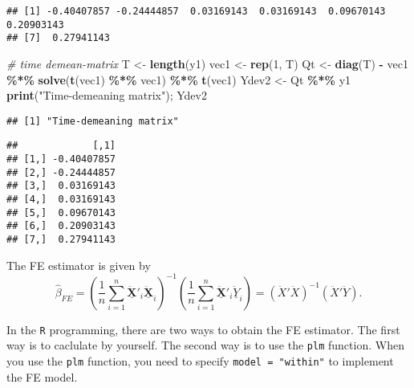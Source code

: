 \documentclass[
  12pt,
]{article}
\newenvironment{Shaded}{\begin{snugshade}}{\end{snugshade}}
\newcommand{\CommentTok}[1]{\textcolor[rgb]{0.56,0.35,0.01}{\textit{#1}}}
\newcommand{\DecValTok}[1]{\textcolor[rgb]{0.00,0.00,0.81}{#1}}
\newcommand{\KeywordTok}[1]{\textcolor[rgb]{0.13,0.29,0.53}{\textbf{#1}}}
\newcommand{\NormalTok}[1]{#1}
\newcommand{\OperatorTok}[1]{\textcolor[rgb]{0.81,0.36,0.00}{\textbf{#1}}}
\newcommand{\StringTok}[1]{\textcolor[rgb]{0.31,0.60,0.02}{#1}}
\begin{document}
\begin{verbatim}
## [1] -0.40407857 -0.24444857  0.03169143  0.03169143  0.09670143  0.20903143
## [7]  0.27941143
\end{verbatim}

\begin{Shaded}
\begin{Highlighting}[]
\CommentTok{\# time demean{-}matrix}
\NormalTok{T \textless{}{-}}\StringTok{ }\KeywordTok{length}\NormalTok{(y1)}
\NormalTok{vec1 \textless{}{-}}\StringTok{ }\KeywordTok{rep}\NormalTok{(}\DecValTok{1}\NormalTok{, T)}
\NormalTok{Qt \textless{}{-}}\StringTok{ }\KeywordTok{diag}\NormalTok{(T) }\OperatorTok{{-}}\StringTok{ }\NormalTok{vec1 }\OperatorTok{\%*\%}\StringTok{ }\KeywordTok{solve}\NormalTok{(}\KeywordTok{t}\NormalTok{(vec1) }\OperatorTok{\%*\%}\StringTok{ }\NormalTok{vec1) }\OperatorTok{\%*\%}\StringTok{ }\KeywordTok{t}\NormalTok{(vec1)}
\NormalTok{Ydev2 \textless{}{-}}\StringTok{ }\NormalTok{Qt }\OperatorTok{\%*\%}\StringTok{ }\NormalTok{y1}
\KeywordTok{print}\NormalTok{(}\StringTok{"Time{-}demeaning matrix"}\NormalTok{); Ydev2}
\end{Highlighting}
\end{Shaded}

\begin{verbatim}
## [1] "Time-demeaning matrix"
\end{verbatim}

\begin{verbatim}
##             [,1]
## [1,] -0.40407857
## [2,] -0.24444857
## [3,]  0.03169143
## [4,]  0.03169143
## [5,]  0.09670143
## [6,]  0.20903143
## [7,]  0.27941143
\end{verbatim}

The FE estimator is given by
\[
  \hat{\beta}_{FE} = 
  \left( \frac{1}{n} \sum_{i=1}^n \ddot{\underline{\mathbf{X}}}'_i 
  \ddot{\underline{\mathbf{X}}}_i \right)^{-1}
  \left( \frac{1}{n} \sum_{i=1}^n \ddot{\underline{\mathbf{X}}}'_i \ddot{\underline{Y}}_i \right)
  = (\ddot{X}' \ddot{X})^{-1}(\ddot{X}' \ddot{Y}).
\]

In the \texttt{R} programming,
there are two ways to obtain the FE estimator.
The first way is to caclulate by yourself.
The second way is to use the \texttt{plm} function.
When you use the \texttt{plm} function,
you need to specify \texttt{model\ =\ "within"} to implement the FE model.
\end{document}
